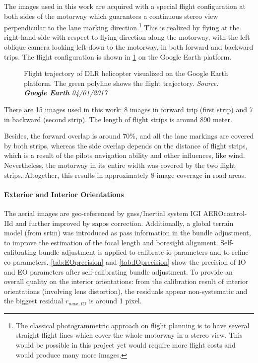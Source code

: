 The images used in this work are acquired with a special flight configuration at both sides of the motorway which guarantees a continuous stereo view perpendicular to the lane marking direction.\footnote{The classical photogrammetric approach on flight planning is to have several straight flight lines which cover the whole motorway in a stereo view. This would be possible in this project yet would require more flight costs and would produce many more images.} This is realized by flying at the right-hand side with respect to flying direction along the motorway, with the left oblique camera looking left-down to the motorway, in both forward and backward trips. The flight configuration is shown in \cref{fig:FlightTrajectory} on the Google Earth platform.

\begin{figure}%
	\centering
	\caption{\small Flight trajectory of DLR helicopter visualized on the Google Earth platform. The green polyline shows the flight trajectory. \textit{Source: \textbf{Google Earth} 04/01/2017}}
	\label{fig:FlightTrajectory}
\end{figure}

\clearpage
There are 15 images used in this work: 8 images in forward trip (first strip) and 7 in backward (second strip). The length of flight strips is around 890 meter.

Besides, the forward overlap is around 70\%, and all the lane markings are covered by both strips, whereas the side overlap depends on the distance of flight strips, which is a result of the pilots navigation ability and other influences, like wind. Nevertheless, the motorway in its entire width was covered by the two flight strips. Altogether, this results in approximately 8-image coverage in road areas. 


\paragraph{Exterior and Interior Orientations}
The aerial images are geo-referenced by \gls{gnss}/Inertial system IGI AEROcontrol-IId and further improved by \gls{sapos} correction. Additionally, a global terrain model (from \gls{srtm}) was introduced as pass information in the bundle adjustment, to improve the estimation of the focal length and boresight alignment. Self-calibrating bundle adjustment is applied to calibrate \gls{io} parameters and to refine \gls{eo} parameters. \cref{tab:EOprecision} and \cref{tab:IOprecision} show the precision of IO and EO parameters after self-calibrating bundle adjustment. %
To provide an overall quality on the interior orientations: from the calibration result of interior orientations (involving lens distortion), the residuals appear non-systematic and the biggest residual $r_{max, IO}$ is around 1 pixel.%

